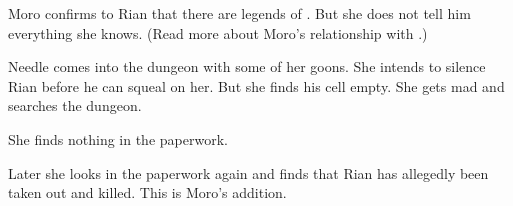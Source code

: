 
Moro confirms to Rian that there are legends of \serpentmen. 
But she does not tell him everything she knows. 
(Read more about Moro's relationship with \quiljaaran.)






\begin{comment}
  \section{Needle looks for Rian}
\end{comment}
\begin{garbage}
Needle comes into the dungeon with some of her goons. 
She intends to silence Rian before he can squeal on her. 
But she finds his cell empty. 
She gets mad and searches the dungeon. 

She finds nothing in the paperwork. 

Later she looks in the paperwork again and finds that Rian has allegedly been taken out and killed. 
This is Moro's addition. 
\end{garbage}










